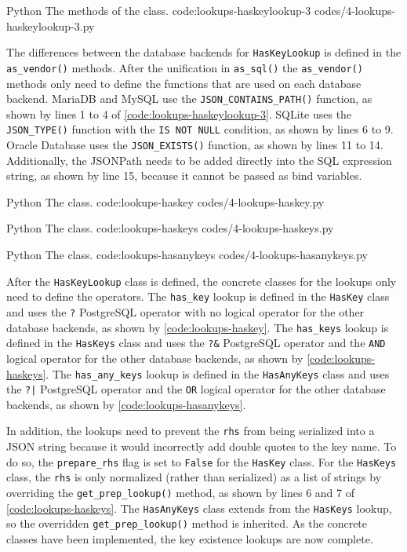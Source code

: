 \listing
{Python}
{The  methods of the  class.}
{code:lookups-haskeylookup-3}
{codes/4-lookups-haskeylookup-3.py}

The differences between the database backends for \verb|HasKeyLookup| is
defined in the \verb|as_vendor()| methods. After the unification in
\verb|as_sql()| the \verb|as_vendor()| methods only need to define the
functions that are used on each database backend. MariaDB and MySQL use the
\verb|JSON_CONTAINS_PATH()| function, as shown by lines 1 to 4 of
\autoref{code:lookups-haskeylookup-3}. SQLite uses the \verb|JSON_TYPE()|
function with the \verb|IS NOT NULL| condition, as shown by lines 6 to 9.
Oracle Database uses the \verb|JSON_EXISTS()| function, as shown by lines 11 to
14. Additionally, the JSONPath needs to be added directly into the SQL
expression string, as shown by line 15, because it cannot be passed as bind
variables.

\listing
{Python}
{The  class.}
{code:lookups-haskey}
{codes/4-lookups-haskey.py}

\listing
{Python}
{The  class.}
{code:lookups-haskeys}
{codes/4-lookups-haskeys.py}

\listing
{Python}
{The  class.}
{code:lookups-hasanykeys}
{codes/4-lookups-hasanykeys.py}

After the \verb|HasKeyLookup| class is defined, the concrete classes for the
lookups only need to define the operators. The \verb|has_key| lookup is defined
in the \verb|HasKey| class and uses the \verb|?| PostgreSQL operator with no
logical operator for the other database backends, as shown by
\autoref{code:lookups-haskey}. The \verb|has_keys| lookup is defined in the
\verb|HasKeys| class and uses the \verb|?&| PostgreSQL operator and the
\verb|AND| logical operator for the other database backends, as shown by
\autoref{code:lookups-haskeys}. The \verb|has_any_keys| lookup is defined in
the \verb|HasAnyKeys| class and uses the \verb=?|= PostgreSQL operator and the
\verb|OR| logical operator for the other database backends, as shown by
\autoref{code:lookups-hasanykeys}.

In addition, the lookups need to prevent the \verb|rhs| from being serialized
into a JSON string because it would incorrectly add double quotes to the key
name. To do so, the \verb|prepare_rhs| flag is set to \verb|False| for the
\verb|HasKey| class. For the \verb|HasKeys| class, the \verb|rhs| is only
normalized (rather than serialized) as a list of strings by overriding the
\verb|get_prep_lookup()| method, as shown by lines 6 and 7 of
\autoref{code:lookups-haskeys}. The \verb|HasAnyKeys| class extends from the
\verb|HasKeys| lookup, so the overridden \verb|get_prep_lookup()| method is
inherited. As the concrete classes have been implemented, the key existence
lookups are now complete.
